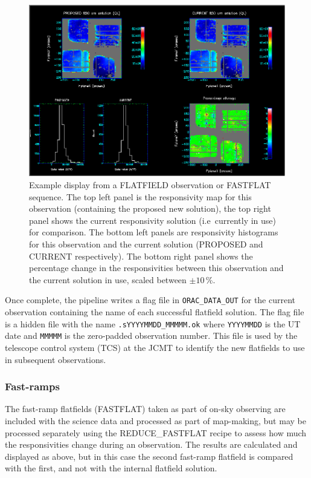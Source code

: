 \documentclass[twoside,11pt,nolof]{starlink}
\providecommand{\task}[1]{\textsf{#1}}
\begin{document}
\begin{figure}[t]
\centering
\includegraphics[width=\textwidth]{sun264_flatfield}
\caption{Example display from a FLATFIELD observation or FASTFLAT
  sequence. The top left panel is the responsivity map for this
  observation (containing the proposed new solution), the top right
  panel shows the current responsivity solution (i.e\ currently in
  use) for comparison. The bottom left panels are responsivity
  histograms for this observation and the current solution (PROPOSED
  and CURRENT respectively). The bottom right panel shows the
  percentage change in the responsivities between this observation and
  the current solution in use, scaled between
  $\pm10$\,\%.\label{fig:flatfield}}
\end{figure}

Once complete, the pipeline writes a flag file in
\verb+ORAC_DATA_OUT+ for the current observation containing the name
of each successful flatfield solution. The flag file is a hidden file
with the name \verb+.sYYYYMMDD_MMMMM.ok+ where \verb+YYYYMMDD+ is the
UT date and \verb+MMMMM+ is the zero-padded observation number. This
file is used by the telescope control system (TCS) at the JCMT to
identify the new flatfields to use in subsequent observations.

\subsubsection{Fast-ramps}

The fast-ramp flatfields (FASTFLAT) taken as part of on-sky observing
are included with the science data and processed as part of
map-making, but may be processed separately using the
\task{REDUCE\_FASTFLAT} recipe to assess how much the responsivities
change during an observation. The results are calculated and displayed
as above, but in this case the second fast-ramp flatfield is compared
with the first, and not with the internal flatfield solution.
\end{document}
